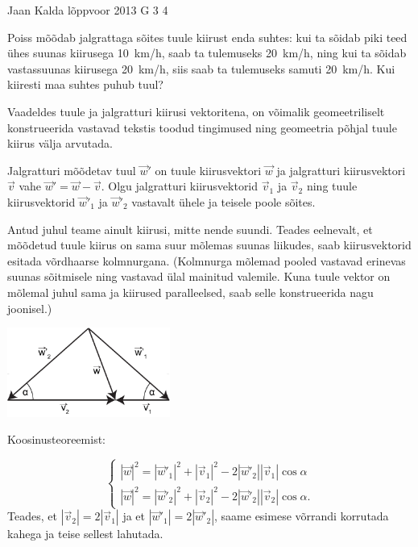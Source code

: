 {Jaan Kalda} %
{lõppvoor} %
{2013} %
{G 3} %
{4} %
{
\ifStatement
Poiss mõõdab jalgrattaga sõites tuule kiirust enda suhtes: kui ta sõidab piki teed ühes
suunas kiirusega \SI{10}{km/h}, saab ta tulemuseks \SI{20}{km/h}, ning kui ta sõidab
vastassuunas kiirusega \SI{20}{km/h}, siis saab ta tulemuseks samuti
\SI{20}{km/h}. Kui kiiresti maa suhtes puhub tuul?
\fi


\ifHint
Vaadeldes tuule ja jalgratturi kiirusi vektoritena, on võimalik geomeetriliselt konstrueerida vastavad tekstis toodud tingimused ning geomeetria põhjal tuule kiirus välja arvutada.
\fi


\ifSolution
Jalgratturi mõõdetav tuul $\vec w'$ on tuule kiirusvektori $\vec w$ ja jalgratturi kiirusvektori $\vec v$ vahe $\vec w'=\vec w - \vec v$. Olgu jalgratturi kiirusvektorid $\vec v_1$ ja $\vec v_2$ ning tuule kiirusvektorid  $\vec w'_1$ ja $\vec w'_2$ vastavalt ühele ja teisele poole sõites.

Antud juhul teame ainult kiirusi, mitte nende suundi. Teades eelnevalt, et mõõdetud tuule kiirus on sama suur mõlemas suunas liikudes, saab kiirusvektorid esitada võrdhaarse kolmnurgana. (Kolmnurga mõlemad pooled vastavad erinevas suunas sõitmisele ning vastavad ülal mainitud valemile. Kuna tuule vektor on mõlemal juhul sama ja kiirused paralleelsed, saab selle konstrueerida nagu joonisel.)

\begin{center}
\includegraphics[width=0.4\textwidth]{2013-v3g-03-jalgrattur}\\
\end{center}

Koosinusteoreemist: 

$$
\begin{cases}
|\vec w|^2 = |\vec w'_1|^2 + |\vec v_1|^2  - 2  |\vec w'_2|  |\vec v_1|\cos \alpha \\
|\vec w|^2 = |\vec w'_2|^2 + |\vec v_2|^2  - 2  |\vec w'_2|  |\vec v_2|\cos \alpha.
\end{cases}
$$
Teades, et $ |\vec v_2|=2 |\vec v_1|$ ja et  $ |\vec w'_1|=2 |\vec w'_2|$, saame esimese võrrandi korrutada kahega ja teise sellest lahutada.

}
